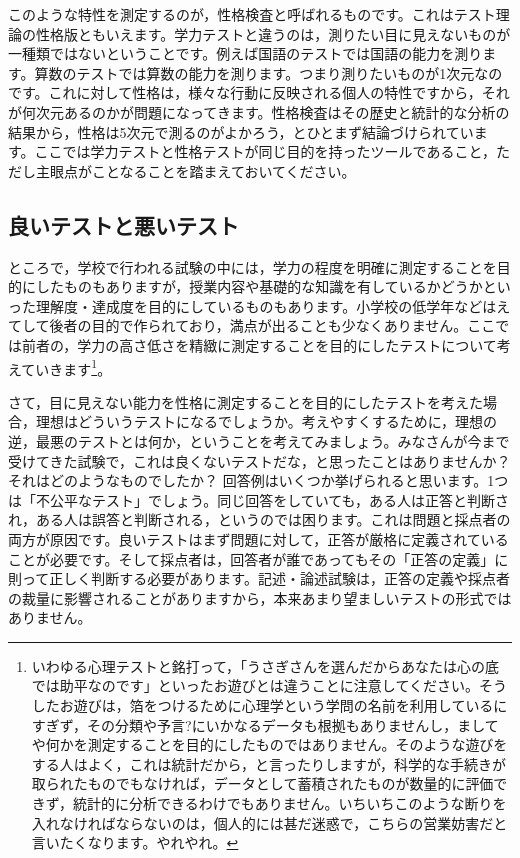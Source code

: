 \documentclass{ltjbook}
\begin{document}
このような特性を測定するのが，性格検査と呼ばれるものです。これはテスト理論の性格版ともいえます。学力テストと違うのは，測りたい目に見えないものが一種類ではないということです。例えば国語のテストでは国語の能力を測ります。算数のテストでは算数の能力を測ります。つまり測りたいものが1次元なのです。これに対して性格は，様々な行動に反映される個人の特性ですから，それが何次元あるのかが問題になってきます。性格検査はその歴史と統計的な分析の結果から，性格は5次元で測るのがよかろう，とひとまず結論づけられています。ここでは学力テストと性格テストが同じ目的を持ったツールであること，ただし主眼点がことなることを踏まえておいてください。

\subsection{良いテストと悪いテスト}
ところで，学校で行われる試験の中には，学力の程度を明確に測定することを目的にしたものもありますが，授業内容や基礎的な知識を有しているかどうかといった理解度・達成度を目的にしているものもあります。小学校の低学年などはえてして後者の目的で作られており，満点が出ることも少なくありません。ここでは前者の，学力の高さ低さを精緻に測定することを目的にしたテストについて考えていきます\footnote{いわゆる心理テストと銘打って，「うさぎさんを選んだからあなたは心の底では助平なのです」といったお遊びとは違うことに注意してください。そうしたお遊びは，箔をつけるために心理学という学問の名前を利用しているにすぎず，その分類や予言?にいかなるデータも根拠もありませんし，ましてや何かを測定することを目的にしたものではありません。そのような遊びをする人はよく，これは統計だから，と言ったりしますが，科学的な手続きが取られたものでもなければ，データとして蓄積されたものが数量的に評価できず，統計的に分析できるわけでもありません。いちいちこのような断りを入れなければならないのは，個人的には甚だ迷惑で，こちらの営業妨害だと言いたくなります。やれやれ。}。

さて，目に見えない能力を性格に測定することを目的にしたテストを考えた場合，理想はどういうテストになるでしょうか。考えやすくするために，理想の逆，最悪のテストとは何か，ということを考えてみましょう。みなさんが今まで受けてきた試験で，これは良くないテストだな，と思ったことはありませんか？ それはどのようなものでしたか？ 
回答例はいくつか挙げられると思います。1つは「不公平なテスト」でしょう。同じ回答をしていても，ある人は正答と判断され，ある人は誤答と判断される，というのでは困ります。これは問題と採点者の両方が原因です。良いテストはまず問題に対して，正答が厳格に定義されていることが必要です。そして採点者は，回答者が誰であってもその「正答の定義」に則って正しく判断する必要があります。記述・論述試験は，正答の定義や採点者の裁量に影響されることがありますから，本来あまり望ましいテストの形式ではありません。
\end{document}
